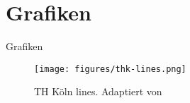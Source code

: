 \documentclass{beamer}
\begin{document}
\section{Grafiken}\label{sec:graphics}
\begin{frame}{Grafiken}
    \begin{figure}\label{thk-linien}
        \texttt{[image: figures/thk-lines.png]}
        \caption[TH Köln lines]{TH Köln lines. Adaptiert von \cite{source}}
    \end{figure}
\end{frame}
\end{document}
